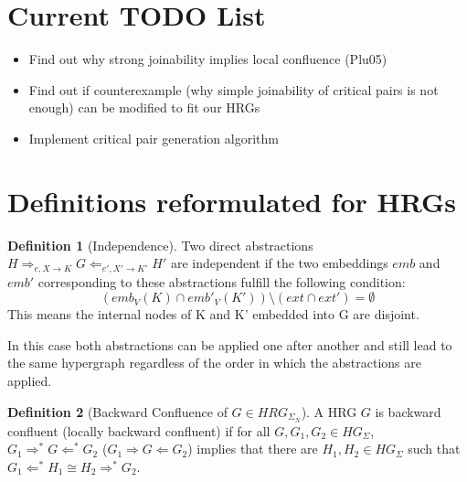 \documentclass[12pt]{article}
\theoremstyle{definition}
\newtheorem{definition}{Definition}
\begin{document}
\maketitle

\begin{abstract}
In general hypergraph transformation systems confluence and backwards confluence is not decidable. This thesis explores if it is possible to decide backwards confluence for \emph{context-free} hyperedge replacement grammars (HRGs).
Additionally it shows heuristics to complete HRGs by adding additional rules that lead to a backwards confluent HRG.
\end{abstract}

\section{Current TODO List}
\begin{itemize}
\item Find out why strong joinability implies local confluence (Plu05)
\item Find out if counterexample (why simple joinability of critical pairs is not enough) can be modified to fit our HRGs
\item Implement critical pair generation algorithm
\end{itemize}

\section{Definitions reformulated for HRGs}
\begin{definition}[Independence]
Two direct abstractions $H \Rightarrow_{e, X \rightarrow K} G \Leftarrow_{e', X' \rightarrow K'} H' $ are independent if the two embeddings $emb$ and $emb'$ corresponding to these abstractions fulfill the following condition:
$$(emb_V(K) \cap emb'_V(K')) \setminus (ext \cap ext') = \emptyset$$
This means the internal nodes of K and K' embedded into G are disjoint.

In this case both abstractions can be applied one after another and still lead to the same hypergraph regardless of the order in which the abstractions are applied. 
\end{definition}

\begin{definition}[Backward Confluence of $G \in HRG_{\Sigma_N}$]
A HRG $G$ is backward confluent (locally backward confluent) if for all $G, G_1, G_2 \in HG_\Sigma$, $G_1 \Rightarrow^* G \Leftarrow^* G_2$ ($G_1 \Rightarrow G \Leftarrow G_2$) implies that there are $H_1, H_2 \in HG_\Sigma$ such that $G_1 \Leftarrow^*H_1 \cong H_2 \Rightarrow^* G_2$.
\end{definition}
\end{document}
